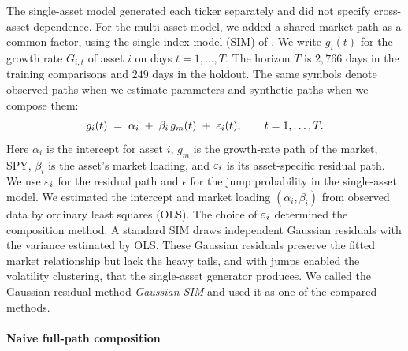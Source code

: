 
The single-asset model generated each ticker separately and did not
specify cross-asset dependence. For the multi-asset model, we added a
shared market path as a common factor, using the single-index model
(SIM) of \citet{sharpe1963}. We write $g_i(t)$ for the growth rate $G_{i,t}$ of asset $i$ on days
$t=1,\dots,T$. The horizon $T$ is $2{,}766$ days in the training
comparisons and $249$ days in the holdout. The same symbols denote
observed paths when we estimate parameters and synthetic paths when
we compose them:
\begin{equation}
  g_i(t) \;=\; \alpha_i \;+\; \beta_i\, g_m(t) \;+\; \varepsilon_i(t),
  \qquad t = 1,\dots,T.
  \label{eq:sim-composition}
\end{equation}
Here $\alpha_i$ is the intercept for asset $i$, $g_m$ is the
growth-rate path of the market, SPY, $\beta_i$ is the asset's market
loading, and $\varepsilon_i$ is its asset-specific residual path. We use
$\varepsilon_i$ for the residual path and $\epsilon$ for the jump probability
in the single-asset model. We estimated the intercept and market
loading $(\alpha_i,\beta_i)$ from observed data by ordinary least
squares (OLS). The choice of $\varepsilon_i$ determined the composition
method. A standard SIM draws independent Gaussian residuals with the
variance estimated by OLS. These Gaussian residuals preserve the fitted market relationship but
lack the heavy tails, and with jumps enabled the volatility
clustering, that the single-asset generator produces. We called the Gaussian-residual method
\emph{Gaussian SIM} and used it as one of the compared methods.

\paragraph{Naive full-path composition}


